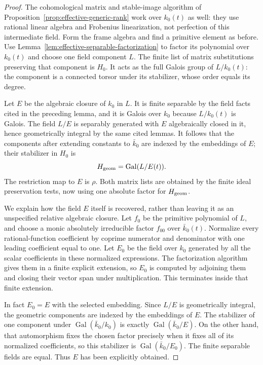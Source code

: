 \begin{proof}
The cohomological matrix and stable-image algorithm
of Proposition~\ref{prop:effective-generic-rank} work
over $k_0(t)$ as well: they use rational linear
algebra and Frobenius linearization, not perfection
of this intermediate field.  Form the frame algebra
and find a primitive element as before.
Use Lemma~\ref{lem:effective-separable-factorization}
to factor its polynomial over $k_0(t)$ and choose
one field component $L$.
The finite list of matrix substitutions preserving
that component is $H_0$.
It acts as the full Galois group of $L/k_0(t)$:
the component is a connected torsor under its
stabilizer, whose order equals its degree.

Let $E$ be the algebraic closure of $k_0$ in $L$.
It is finite separable by the field facts cited
in the preceding lemma, and it is Galois over $k_0$
because $L/k_0(t)$ is Galois.
The field $L/E$ is separably generated with $E$
algebraically closed in it, hence geometrically
integral by the same cited lemmas.
It follows that the components after extending
constants to $\bar k_0$ are indexed by the embeddings
of $E$; their stabilizer in $H_0$ is
\[
 H_{\rm geom}=\operatorname{Gal}(L/E(t)).
\]
The restriction map to $E$ is $\rho$.
Both matrix lists are obtained by the finite ideal
preservation tests, now using one absolute factor
for $H_{\rm geom}$.

We explain how the field $E$ itself is recovered,
rather than leaving it as an unspecified relative
algebraic closure.  Let $f_0$ be the primitive
polynomial of $L$, and choose a monic absolutely
irreducible factor $f_{00}$ over $\bar k_0(t)$.
Normalize every rational-function coefficient by
coprime numerator and denominator with one leading
coefficient equal to one.
Let $E_0$ be the field over $k_0$ generated by all
the scalar coefficients in these normalized expressions.
The factorization algorithm gives them in a finite
explicit extension, so $E_0$ is computed by adjoining
them and closing their vector span under multiplication.
This terminates inside that finite extension.

In fact $E_0=E$ with the selected embedding.
Since $L/E$ is geometrically integral, the geometric
components are indexed by the embeddings of $E$.
The stabilizer of one component under
$\operatorname{Gal}(\bar k_0/k_0)$ is exactly
$\operatorname{Gal}(\bar k_0/E)$.
On the other hand, that automorphism fixes the
chosen factor precisely when it fixes all of its
normalized coefficients, so this stabilizer is
$\operatorname{Gal}(\bar k_0/E_0)$.
The finite separable fields are equal.
Thus $E$ has been explicitly obtained.


\end{proof}
